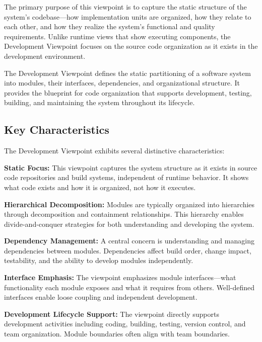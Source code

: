 \documentclass[11pt,letterpaper]{article}
\begin{document}
The primary purpose of this viewpoint is to capture the static structure of the system's codebase---how implementation units are organized, how they relate to each other, and how they realize the system's functional and quality requirements. Unlike runtime views that show executing components, the Development Viewpoint focuses on the source code organization as it exists in the development environment.

\begin{definitionbox}
The Development Viewpoint defines the static partitioning of a software system into modules, their interfaces, dependencies, and organizational structure. It provides the blueprint for code organization that supports development, testing, building, and maintaining the system throughout its lifecycle.
\end{definitionbox}

\subsection{Key Characteristics}

The Development Viewpoint exhibits several distinctive characteristics:

\textbf{Static Focus:} This viewpoint captures the system structure as it exists in source code repositories and build systems, independent of runtime behavior. It shows what code exists and how it is organized, not how it executes.

\textbf{Hierarchical Decomposition:} Modules are typically organized into hierarchies through decomposition and containment relationships. This hierarchy enables divide-and-conquer strategies for both understanding and developing the system.

\textbf{Dependency Management:} A central concern is understanding and managing dependencies between modules. Dependencies affect build order, change impact, testability, and the ability to develop modules independently.

\textbf{Interface Emphasis:} The viewpoint emphasizes module interfaces---what functionality each module exposes and what it requires from others. Well-defined interfaces enable loose coupling and independent development.

\textbf{Development Lifecycle Support:} The viewpoint directly supports development activities including coding, building, testing, version control, and team organization. Module boundaries often align with team boundaries.
\end{document}
